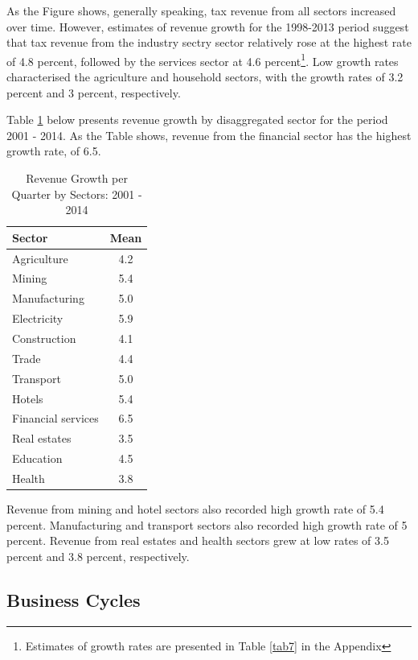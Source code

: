 \documentclass[12pt,a4paper,final]{article}
\begin{document}
As the Figure shows, generally speaking, tax revenue from all sectors increased over time.  However, estimates of revenue growth for the 1998-2013 period suggest that tax revenue from the industry sectry sector relatively rose at the highest rate of 4.8 percent, followed by the services sector at 4.6 percent\footnote{Estimates of growth rates are presented in Table \ref{tab7} in the Appendix}.   Low growth rates characterised the agriculture and household sectors, with the growth rates of 3.2 percent and 3 percent, respectively.

\newpage
Table \ref{tab1} below presents revenue growth by disaggregated sector for the period 2001 - 2014. As the Table shows, revenue from the financial sector has the highest growth rate, of 6.5. 

\begin{table}[h]
\centering
\begin{small} 
\caption{Revenue Growth per Quarter by Sectors: 2001 - 2014} 
\label{tab1}
\begin{tabular}{l c }
\toprule
\multicolumn{1}{l}{\textbf{Sector}} & \textbf{Mean}\\ 
 \midrule
Agriculture & 4.2\\ 
Mining & 5.4 \\
Manufacturing & 5.0 \\
Electricity & 5.9\\
Construction & 4.1\\
Trade  & 4.4\\
Transport  & 5.0 \\
Hotels & 5.4\\
Financial services & 6.5\\
Real estates & 3.5\\
Education & 4.5\\
Health & 3.8\\
\bottomrule
\end{tabular}
\end{small}
\end{table}

Revenue from mining and hotel sectors also recorded high growth rate of 5.4 percent. Manufacturing and transport sectors also recorded high growth rate of 5 percent.  Revenue from real estates and health sectors grew at low rates of 3.5 percent and 3.8 percent, respectively.

\subsection{Business Cycles}
\end{document}
